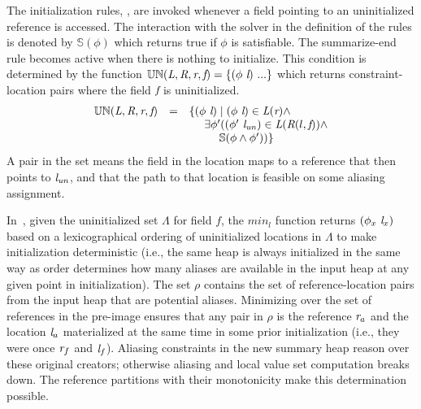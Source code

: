The initialization rules, , are invoked whenever a
field pointing to an uninitialized reference is accessed. The
interaction with the solver in the definition of the rules is denoted
by $\mathbb{S}(\phi)$ which returns true if $\phi$ is satisfiable. The
summarize-end rule becomes active when there is nothing to
initialize. This condition is determined by the function
$\mathbb{UN}(\emph{L}, \emph{R}, \emph{r}, \emph{f}) =
\{(\phi\ \emph{l})\ ...\}$ which returns constraint-location
pairs where the field $\emph{f}$ is uninitialized.
\[
\begin{array}{rcl}
\mathbb{UN}(\cfgnt{L}, \cfgnt{R}, \cfgnt{r}, \cfgnt{f}) & = &\{ \lp\phi\ \cfgnt{l}\rp \mid \lp \phi\ \cfgnt{l}\rp  \in \cfgnt{L}\lp \cfgnt{r}\rp  \wedge \\
& & \ \ \ \ \exists \phi^\prime \lp \lp \phi^\prime\ \cfgnt{l}_\mathit{un}\rp  \in \cfgnt{L}\lp \cfgnt{R}\lp l,\cfgnt{f}\rp\rp \wedge \\
& & \ \ \ \ \ \ \ \ \mathbb{S}\lp \phi \wedge \phi^\prime \rp\rp\}\\
\end{array}
\]
A pair in the set means the field in the location maps to a reference
that then points to $\emph{l}_\mathit{un}$, and that the path to that
location is feasible on some aliasing assignment. 


In~, given the uninitialized set $\Lambda$ for
field $f$, the $\mathit{min}_l$ function returns
$(\phi_x\ \cfgnt{l}_x)$ based on a lexicographical ordering of
uninitialized locations in $\Lambda$ to make initialization
deterministic (i.e., the same heap is always initialized in the same
way as order determines how many aliases are available in the input heap at any given point in initialization). 
The set $\rho$ contains the set of
reference-location pairs from the input heap that are potential
aliases. Minimizing over the set of references in the pre-image ensures
that any pair in $\rho$ is the reference $\emph{r}_a$ and the location $\emph{l}_a$ materialized at the same time in some prior initialization (i.e., they were once
$\emph{r}_f$ and $\emph{l}_f$). Aliasing constraints
in the new summary heap reason over these original creators; otherwise aliasing and local value set
computation breaks down.  The reference partitions with their
monotonicity make this determination possible.

